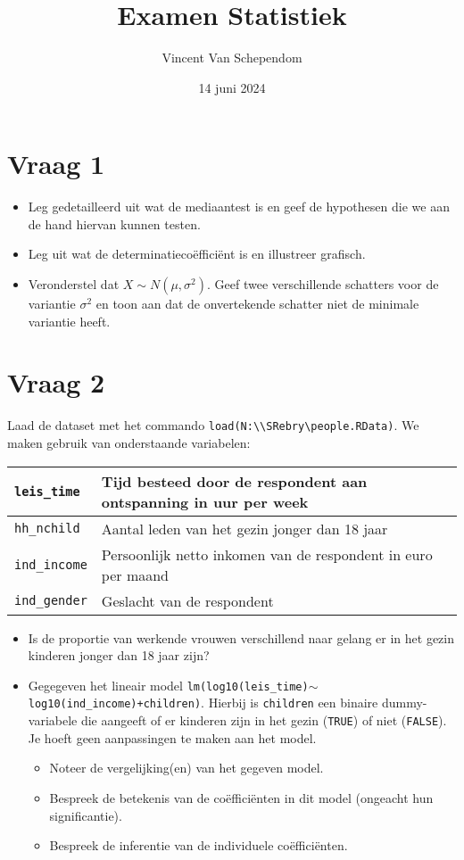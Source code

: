 \documentclass[kulak]{kulakarticle} %
\title{Examen Statistiek}
\author{Vincent Van Schependom}
\date{14 juni 2024}
\begin{document}
\maketitle

\section*{Vraag 1}

\begin{itemize}
	\item Leg gedetailleerd uit wat de mediaantest is en geef de hypothesen die we aan de hand hiervan kunnen testen.
	\item Leg uit wat de determinatiecoëfficiënt is en illustreer grafisch.
	\item Veronderstel dat \(X \sim N(\mu,\sigma^2)\). Geef twee verschillende schatters voor de variantie \(\sigma^2\) en toon aan dat de onvertekende schatter niet de minimale variantie heeft.
\end{itemize}

\section*{Vraag 2}

Laad de dataset met het commando \texttt{load(N:\textbackslash\textbackslash SRebry\textbackslash people.RData)}. We maken gebruik van onderstaande variabelen:
\begin{center}
\begin{tabular}{l|p{5cm}}
	\texttt{leis\_time} & Tijd besteed door de respondent aan ontspanning in uur per week \\
	\hline
	\texttt{hh\_nchild}        & Aantal leden van het gezin jonger dan 18 jaar \\
	\hline
	\texttt{ind\_income}       & Persoonlijk netto inkomen van de respondent in euro per maand \\
	\hline
	\texttt{ind\_gender}       & Geslacht van de respondent
\end{tabular}
\end{center}
\begin{itemize}
	\item Is de proportie van werkende vrouwen verschillend naar gelang er in het gezin kinderen jonger dan 18 jaar zijn?
	\item Gegegeven het lineair model \texttt{lm(log10(leis\_time)\(\sim\)log10(ind\_income)+children)}. Hierbij is \texttt{children} een binaire dummy-variabele die aangeeft of er kinderen zijn in het gezin (\texttt{TRUE}) of niet (\texttt{FALSE}). Je hoeft geen aanpassingen te maken aan het model.
	\begin{itemize}
		\item Noteer de vergelijking(en) van het gegeven model.
		\item Bespreek de betekenis van de coëfficiënten in dit model (ongeacht hun significantie).
		\item Bespreek de inferentie van de individuele coëfficiënten.
	\end{itemize}
\end{itemize}
\end{document}

